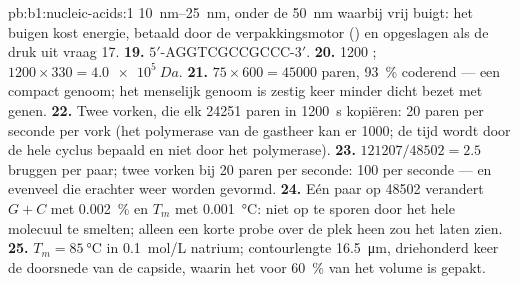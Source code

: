 \begin{solution}{pb:b1:nucleic-acids:1}
\qtyrange{10}{25}{nm}, onder de \qty{50}{nm} waarbij  vrij buigt: het buigen
kost energie, betaald door de verpakkingsmotor () en opgeslagen als de druk uit
vraag 17.
\textbf{19.} $5'$-AGGTCGCCGCCC-$3'$.
\textbf{20.} \num{1200} ; $1200\times 330 = \qty{4.0e5}{Da}$.
\textbf{21.} $75\times 600 = \num{45000}$ paren, \qty{93}{\%} coderend --- een
compact genoom; het menselijk genoom is zestig keer minder dicht bezet met genen.
\textbf{22.} Twee vorken, die elk \num{24251} paren in \qty{1200}{s} kopiëren:
\qty{20}{} paren per seconde per vork (het polymerase van de gastheer kan er
\qty{1000}{}; de tijd wordt door de hele cyclus bepaald en niet door het
polymerase).
\textbf{23.} $\num{121207}/\num{48502} = 2.5$ bruggen per paar; twee vorken bij 20 paren per seconde: 100  per seconde --- en evenveel die erachter weer worden gevormd.
\textbf{24.} Eén paar op \num{48502} verandert $G + C$ met \qty{0.002}{\%} en
$T_m$ met \qty{0.001}{\celsius}: niet op te sporen door het hele molecuul te
smelten; alleen een korte probe over de plek heen zou het laten zien.
\textbf{25.} $T_m = \qty{85}{\celsius}$ in \qty{0.1}{mol/L} natrium; contourlengte
\qty{16.5}{\micro m}, driehonderd keer de doorsnede van de capside, waarin het
voor \qty{60}{\%} van het volume is gepakt.
\end{solution}
